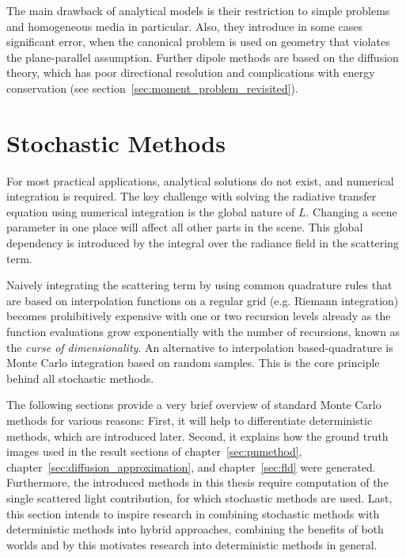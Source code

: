 The main drawback of analytical models is their restriction to simple problems and homogeneous media in particular. Also, they introduce in some cases significant error, when the canonical problem is used on geometry that violates the plane-parallel assumption. Further dipole methods are based on the diffusion theory, which has poor directional resolution and complications with energy conservation (see section~\ref{sec:moment_problem_revisited}).

\section{Stochastic Methods}
\label{sec:foundations_mc}

For most practical applications, analytical solutions do not exist, and numerical integration is required. The key challenge with solving the radiative transfer equation using numerical integration is the global nature of $L$. Changing a scene parameter in one place will affect all other parts in the scene. This global dependency is introduced by the integral over the radiance field in the scattering term. 

Naively integrating the scattering term by using common quadrature rules that are based on interpolation functions on a regular grid (e.g. Riemann integration) becomes prohibitively expensive with one or two recursion levels already as the function evaluations grow exponentially with the number of recursions, known as the \emph{curse of dimensionality}. An alternative to interpolation based-quadrature is Monte Carlo integration based on random samples. This is the core principle behind all stochastic methods.

The following sections provide a very brief overview of standard Monte Carlo methods for various reasons: First, it will help to differentiate deterministic methods, which are introduced later. Second, it explains how the ground truth images used in the result sections of chapter~\ref{sec:pnmethod}, chapter~\ref{sec:diffusion_approximation}, and chapter~\ref{sec:fld} were generated. Furthermore, the introduced methods in this thesis require computation of the single scattered light contribution, for which stochastic methods are used. Last, this section intends to inspire research in combining stochastic methods with deterministic methods into hybrid approaches, combining the benefits of both worlds and by this motivates research into deterministic methods in general.


